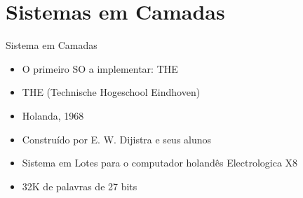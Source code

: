 \documentclass{beamer}
\begin{document}
\section{Sistemas em Camadas}
\begin{frame}{Sistema em Camadas}
    \begin{itemize}
        \item O primeiro SO a implementar: THE
        \item THE (Technische Hogeschool Eindhoven)
        \item Holanda, 1968
        \item Construído por E. W. Dijistra e seus alunos
        \item Sistema em Lotes para o computador holandês Electrologica X8
        \item 32K de palavras de 27 bits
    \end{itemize}
\end{frame}
\end{document}
